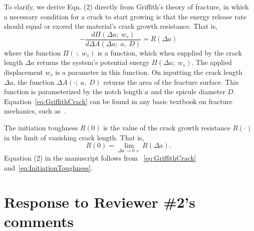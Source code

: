 \documentclass[11pt,letterpaper]{report}
\begin{document}
\begin{enumerate}[label=\textit{1.\arabic*},wide, labelwidth=!, labelindent=0pt]
To clarify, we derive Eqn. (2) directly from Griffith's theory of fracture, in which a necessary condition for a crack to start growing is that the energy release rate should equal or exceed the material's crack growth resistance. That is, 
%
\begin{equation}
-\frac{d \Pi (\Delta a;\; w_s)}{d\Delta A(\Delta a;\; a,\;D)}=R(\Delta a)
\label{eq:GriffithCrack}
\end{equation}
%
where the function $\Pi(\cdot;\;w_s)$ is a function, which when supplied by the crack length $\Delta a$ returns the system's potential energy $\Pi(\Delta a;\;w_s)$.  The applied displacement  $w_s$ is a parameter in this function. On inputting the crack length  $\Delta a$, the function  $\Delta A(\cdot;\; a,\;D)$ returns the area of the fracture surface. This function is parameterized by the notch length $a$ and the spicule diameter $D$. Equation~\eqref{eq:GriffithCrack} can be found in any basic textbook on fracture mechanics, such as~\cite{gross2017fracture, anderson2017fracture, kanninen1985advanced, lawn1993fracture}.


The initiation toughness $R(0)$ is the value of the crack growth resistance $R(\cdot)$ in the limit of vanishing crack length. That is, 
\begin{equation}
R(0)=\lim_{\Delta a\to 0+}R(\Delta a).
\label{eq:InitiationToughness}
\end{equation}
Equation (2) in the manuscript follows from 
~\eqref{eq:GriffithCrack} and~\eqref{eq:InitiationToughness}.


\end{enumerate}

\clearpage

\section*{Response to Reviewer \#2's comments}
\label{rev2}
\end{document}
